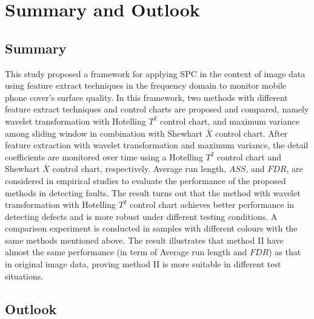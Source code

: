 \chapter{Summary and Outlook}
\label{cp:summary_outlook}

\section{Summary} \label{sec:summary}

\begin{comment}

Here you need to wrap up the thesis in very concise and short paragraph(s). This is normally a very frequent part that your readers take a first look. 

You can also change this sub-chapter to conclusion if you can draw a conclusion based on the results you have found. However, please pay attention to the difference between conclusion and summary.
\end{comment}


This study proposed a framework for applying SPC in the context of image data using feature extract techniques in the frequency domain to monitor mobile phone cover's surface quality. In this framework, two methods with different feature extract techniques and control charts are proposed and compared, namely wavelet transformation with Hotelling $T^{2}$ control chart, and maximum variance among sliding window in combination with Shewhart $\bar{X}$ control chart. After feature extraction with wavelet transformation and maximum variance, the detail coefficients are monitored over time using a Hotelling $T^{2}$ control chart and Shewhart $\bar{X}$ control chart, respectively. Average run length, $ASS$, and $FDR$, are considered in empirical studies to evaluate the performance of the proposed methods in detecting faults. The result turns out that the method with wavelet transformation with Hotelling $T^{2}$ control chart achieves better performance in detecting defects and is more robust under different testing conditions. A comparison experiment is conducted in samples with different colours with the same methods mentioned above. The result illustrates that method II have almost the same performance (in term of Average run length and $FDR$) as that in original image data, proving method II is more suitable in different test situations. 

\section{Outlook} \label{sec:outlook}

